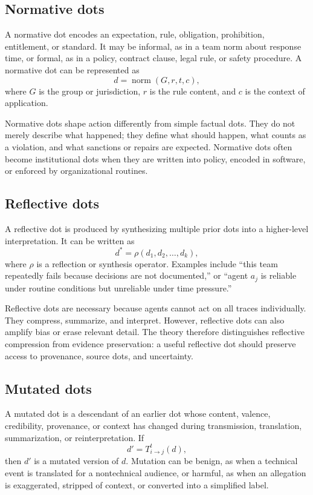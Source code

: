 \documentclass[11pt]{article}
\theoremstyle{remark}
\begin{document}
\subsection{Normative dots}\label{normative-dots}

A normative dot encodes an expectation, rule, obligation, prohibition, entitlement, or standard. It may be informal, as in a team norm about response time, or formal, as in a policy, contract clause, legal rule, or safety procedure. A normative dot can be represented as
\[
d=\operatorname{norm}(G,r,t,c),
\]
where $G$ is the group or jurisdiction, $r$ is the rule content, and $c$ is the context of application.

Normative dots shape action differently from simple factual dots. They do not merely describe what happened; they define what should happen, what counts as a violation, and what sanctions or repairs are expected. Normative dots often become institutional dots when they are written into policy, encoded in software, or enforced by organizational routines.

\subsection{Reflective dots}\label{reflective-dots}

A reflective dot is produced by synthesizing multiple prior dots into a higher-level interpretation. It can be written as
\[
d^*=\rho(d_1,d_2,\ldots,d_k),
\]
where $\rho$ is a reflection or synthesis operator. Examples include ``this team repeatedly fails because decisions are not documented,'' or ``agent $a_j$ is reliable under routine conditions but unreliable under time pressure.''

Reflective dots are necessary because agents cannot act on all traces individually. They compress, summarize, and interpret. However, reflective dots can also amplify bias or erase relevant detail. The theory therefore distinguishes reflective compression from evidence preservation: a useful reflective dot should preserve access to provenance, source dots, and uncertainty.

\subsection{Mutated dots}\label{mutated-dots}

A mutated dot is a descendant of an earlier dot whose content, valence, credibility, provenance, or context has changed during transmission, translation, summarization, or reinterpretation. If
\[
d'=T_{i\to j}^{t}(d),
\]
then $d'$ is a mutated version of $d$. Mutation can be benign, as when a technical event is translated for a nontechnical audience, or harmful, as when an allegation is exaggerated, stripped of context, or converted into a simplified label.
\end{document}
